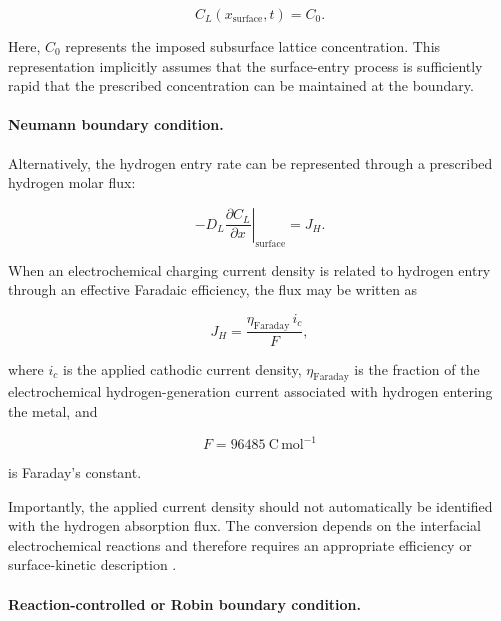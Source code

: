 \begin{equation}
C_L(x_{\mathrm{surface}},t)
=
C_0.
\label{eq:ch3_dirichlet_BC}
\end{equation}

Here, $C_0$ represents the imposed subsurface lattice concentration.
This representation implicitly assumes that the surface-entry process
is sufficiently rapid that the prescribed concentration can be
maintained at the boundary.

\paragraph{Neumann boundary condition.}

Alternatively, the hydrogen entry rate can be represented through a
prescribed hydrogen molar flux:

\begin{equation}
-D_L
\left.
\frac{\partial C_L}{\partial x}
\right|_{\mathrm{surface}}
=
J_H.
\label{eq:ch3_neumann_general}
\end{equation}

When an electrochemical charging current density is related to hydrogen
entry through an effective Faradaic efficiency,
the flux may be written as

\begin{equation}
J_H
=
\frac{
\eta_{\mathrm{Faraday}}\,i_c
}{
F
},
\label{eq:ch3_neumann_electrochemical}
\end{equation}

where $i_c$ is the applied cathodic current density,
$\eta_{\mathrm{Faraday}}$ is the fraction of the electrochemical
hydrogen-generation current associated with hydrogen entering the
metal, and

\begin{equation}
F=96485\ \mathrm{C\,mol^{-1}}
\end{equation}

is Faraday's constant.

Importantly, the applied current density should not automatically be
identified with the hydrogen absorption flux. The conversion depends
on the interfacial electrochemical reactions and therefore requires an
appropriate efficiency or surface-kinetic description
\cite{Turnbull2014,Koren2024a}.

\paragraph{Reaction-controlled or Robin boundary condition.}

